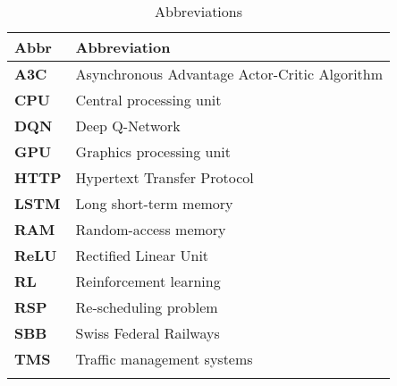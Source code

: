 \begin{longtable}{|m{3cm}|m{11cm}|}\hline	
	\rowcolor{gray} \textbf{Abbr}&
	Abbreviation \\ \hline

	\textbf{A3C}&
	Asynchronous Advantage Actor-Critic Algorithm \\ \hline
	
	\textbf{CPU}&
	Central processing unit \\ 
	\hline

	\textbf{DQN}&
	Deep Q-Network \\ 
	\hline
	
	\textbf{GPU}&
	Graphics processing unit \\ 
	\hline

	\textbf{HTTP}&
	Hypertext Transfer Protocol \\ 
	\hline

	\textbf{LSTM}&
	Long short-term memory \\ 
	\hline

	\textbf{RAM}&
	Random-access memory \\
	\hline

	\textbf{ReLU}&
	Rectified Linear Unit \\
	\hline

	\textbf{RL}&
	Reinforcement learning \\ 
	\hline

	\textbf{RSP}&
	Re-scheduling problem \\ 
	\hline

	\textbf{SBB}&
	Swiss Federal Railways \\
	\hline

	\textbf{TMS}&
	Traffic management systems \\ 
	\hline


\caption{Abbreviations}
\label{tab:abkuerzungsverzeichnis}
\end{longtable}
